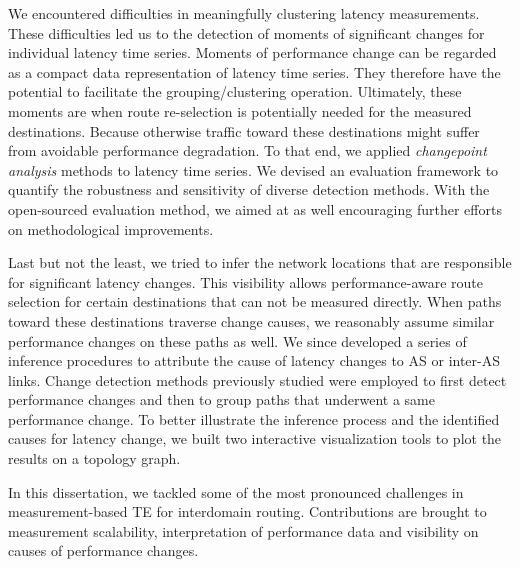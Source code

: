 We encountered difficulties in meaningfully clustering latency measurements. 
These difficulties led us to the detection of moments of significant changes for individual latency time series.
Moments of performance change can be regarded as a compact data representation of latency time series. They therefore have the potential to facilitate the grouping/clustering operation.
Ultimately, these moments are when route re-selection is potentially needed for the measured destinations.
Because otherwise traffic toward these destinations might suffer from avoidable performance degradation.
To that end, we applied \textit{changepoint analysis} methods to latency time series.
We devised an evaluation framework to quantify the robustness and sensitivity of diverse detection methods.
With the open-sourced evaluation method, we aimed at as well encouraging further efforts on methodological improvements.

Last but not the least, we tried to infer the network locations that are responsible for significant latency changes. This visibility allows performance-aware route selection for certain destinations that can not be measured directly.
When paths toward these destinations traverse change causes, we reasonably assume similar performance changes on these paths as well.
We since developed a series of inference procedures to attribute the cause of latency changes to \acf{AS} or inter-AS links.
Change detection methods previously studied were employed to first detect performance changes and then to group paths that underwent a same performance change.
To better illustrate the inference process and the identified causes for latency change, we built two interactive visualization tools to plot the results on a topology graph.

In this dissertation, we tackled some of the most pronounced challenges in measurement-based TE for interdomain routing. Contributions are brought to measurement scalability, interpretation of performance data and visibility on causes of performance changes. 
\vfill

